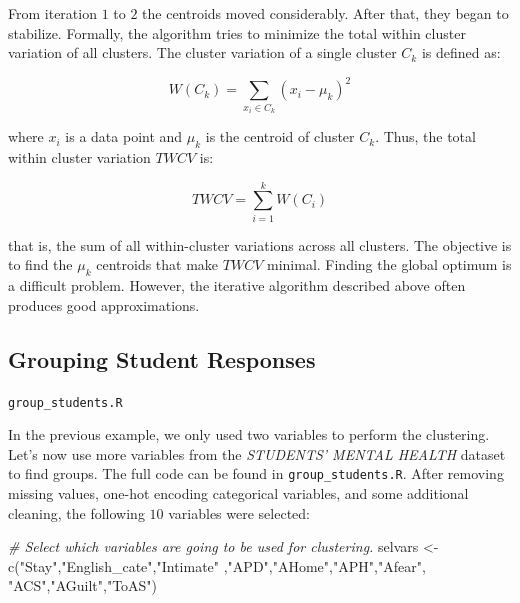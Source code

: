 \documentclass[
  11pt,
]{krantz}
\makeatletter
\newenvironment{Shaded}{\begin{snugshade}}{\end{snugshade}}
\newcommand{\CommentTok}[1]{\textcolor[rgb]{0.37,0.37,0.37}{\textit{#1}}}
\newcommand{\FunctionTok}[1]{\textcolor[rgb]{0,0,0}{#1}}
\newcommand{\NormalTok}[1]{#1}
\newcommand{\OtherTok}[1]{\textcolor[rgb]{0.37,0.37,0.37}{#1}}
\newcommand{\StringTok}[1]{\textcolor[rgb]{0.5,0.5,0.5}{#1}}
\newenvironment{kframe}{%
\medskip{}
\setlength{\fboxsep}{.8em}
 \def\at@end@of@kframe{}%
 \ifinner\ifhmode%
  \def\at@end@of@kframe{\end{minipage}}%
  \begin{minipage}{\columnwidth}%
 \fi\fi%
 \def\FrameCommand##1{\hskip\@totalleftmargin \hskip-\fboxsep
 \colorbox{shadecolor}{##1}\hskip-\fboxsep
     \hskip-\linewidth \hskip-\@totalleftmargin \hskip\columnwidth}%
 \MakeFramed {\advance\hsize-\width
   \@totalleftmargin\z@ \linewidth\hsize
   \@setminipage}}%
 {\par\unskip\endMakeFramed%
 \at@end@of@kframe}
\newenvironment{rmdblock}[1]
  {
  \begin{itemize}
  \renewcommand{\labelitemi}{
    \raisebox{-.7\height}[0pt][0pt]{
      {\setkeys{Gin}{width=3em,keepaspectratio}\texttt{[image: images/icons/\#1]}}
    }
  }
  \setlength{\fboxsep}{1em}
  \begin{kframe}
  \item
  }
  {
  \end{kframe}
  \end{itemize}
  }
\newenvironment{rmdfolder}
  {\begin{rmdblock}{folder}}
  {\end{rmdblock}}
\makeatother
\begin{document}
From iteration \(1\) to \(2\) the centroids moved considerably. After that, they began to stabilize. Formally, the algorithm tries to minimize the total within cluster variation of all clusters. The cluster variation of a single cluster \(C_k\) is defined as:

\begin{equation}
  W(C_k) = \sum_{x_i \in C_k}{(x_i - \mu_k)^2}
  \label{eq:wcv}
\end{equation}

where \(x_i\) is a data point and \(\mu_k\) is the centroid of cluster \(C_k\). Thus, the total within cluster variation \(TWCV\) is:

\begin{equation}
  TWCV = \sum_{i=1}^k{W(C_i)}
  \label{eq:twcv}
\end{equation}

that is, the sum of all within-cluster variations across all clusters. The objective is to find the \(\mu_k\) centroids that make \(TWCV\) minimal. Finding the global optimum is a difficult problem. However, the iterative algorithm described above often produces good approximations.

\hypertarget{studentresponses}{%
\subsection{Grouping Student Responses}\label{studentresponses}}

\begin{rmdfolder}
\texttt{group\_students.R}
\end{rmdfolder}

In the previous example, we only used two variables to perform the clustering. Let's now use more variables from the \emph{STUDENTS' MENTAL HEALTH} dataset to find groups. The full code can be found in \texttt{group\_students.R}. After removing missing values, one-hot encoding categorical variables, and some additional cleaning, the following \(10\) variables were selected:

\begin{Shaded}
\begin{Highlighting}[]
\CommentTok{\# Select which variables are going to be used for clustering.}
\NormalTok{selvars }\OtherTok{\textless{}{-}} \FunctionTok{c}\NormalTok{(}\StringTok{"Stay"}\NormalTok{,}\StringTok{"English\_cate"}\NormalTok{,}\StringTok{"Intimate"}
\NormalTok{             ,}\StringTok{"APD"}\NormalTok{,}\StringTok{"AHome"}\NormalTok{,}\StringTok{"APH"}\NormalTok{,}\StringTok{"Afear"}\NormalTok{,}
             \StringTok{"ACS"}\NormalTok{,}\StringTok{"AGuilt"}\NormalTok{,}\StringTok{"ToAS"}\NormalTok{)}
\end{Highlighting}
\end{Shaded}
\end{document}
